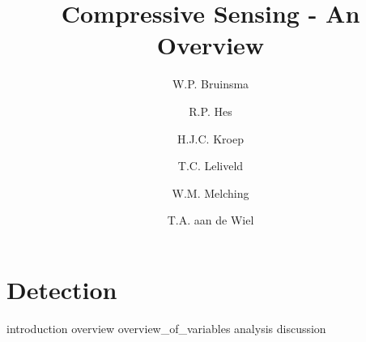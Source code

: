 \documentclass[a4paper, openany, oneside]{memoir}
\title{Compressive Sensing - An Overview}
\author{W.P. Bruinsma \and R.P. Hes \and H.J.C. Kroep \and T.C. Leliveld \and W.M. Melching \and T.A. aan de Wiel}
\begin{document}
\chapter{Detection}

{introduction}
{overview}
{overview_of_variables}
{analysis}
{discussion}
\end{document}
